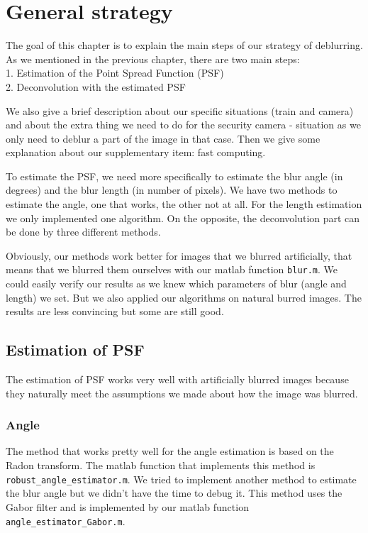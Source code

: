 \chapter{General strategy}

The goal of this chapter is to explain the main steps of our strategy of deblurring. As we mentioned in the previous chapter, there are two main steps:\\
1. Estimation of the Point Spread Function (PSF) \\
2. Deconvolution with the estimated PSF

We also give a brief description about our specific situations (train and camera) and about the extra thing we need to do for the security camera - situation as we only need to deblur a part of the image in that case. Then we give some explanation about our supplementary item: fast computing.

To estimate the PSF, we need more specifically to estimate the blur angle (in degrees) and the blur length (in number of pixels). We have two methods to estimate the angle, one that works, the other not at all. For the length estimation we only implemented one algorithm. On the opposite, the deconvolution part can be done by three different methods. 

Obviously, our methods work better for images that we blurred artificially, that means that we blurred them ourselves with our matlab function \texttt{blur.m}. We could easily verify our results as we knew which parameters of blur (angle and length) we set. But we also applied our algorithms on natural burred images. The results are less convincing but some are still good.
  
\section{Estimation of PSF}

The estimation of PSF works very well with artificially blurred images because they naturally meet the assumptions we made about how the image was blurred.
 
\subsection{Angle}
The method that works pretty well for the angle estimation is based on the Radon transform. The matlab function that implements this method is \texttt{robust\_angle\_estimator.m}. We tried to implement another method to estimate the blur angle but we didn't have the time to debug it. This method uses the Gabor filter and is implemented by our matlab function \texttt{angle\_estimator\_Gabor.m}. 

